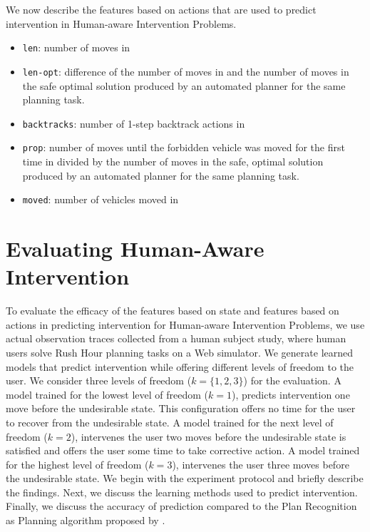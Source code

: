We now describe the features based on actions that are used to predict intervention in Human-aware Intervention Problems.
\begin{itemize}
\item \texttt{len}: number of moves in \historyDef
\item \texttt{len-opt}: difference of the number of moves in \historyDef and the number of moves in the safe optimal solution produced by an automated planner for the same planning task.
\item \texttt{backtracks}: number of 1-step backtrack actions in \historyDef
\item \texttt{prop}: number of moves until the forbidden vehicle was moved for the first time in \historyDef divided by the number of moves in the safe, optimal solution produced by an automated planner for the same planning task.
\item \texttt{moved}: number of vehicles moved in \historyDef
\end{itemize}

\section{Evaluating Human-Aware Intervention}
\label{sec:evaluating-hai}
To evaluate the efficacy of the features based on state and features based on actions in predicting intervention for Human-aware Intervention Problems, we use actual observation traces collected from a human subject study, where human users solve Rush Hour planning tasks on a Web simulator.
We generate learned models that predict intervention while offering different levels of freedom to the user. 
We consider three levels of freedom ($k=\lbrace 1,2,3 \rbrace$) for the evaluation. 
A model trained for the lowest level of freedom ($k=1$), predicts intervention one move before the undesirable state. 
This configuration offers no time for the user to recover from the undesirable state. 
A model trained for the next level of freedom ($k=2$), intervenes the user two moves before the undesirable state is satisfied and offers the user some time to take corrective action. 
A model trained for the highest level of freedom ($k=3$), intervenes the user three moves before the undesirable state.
We begin with the experiment protocol and briefly describe the findings. 
Next, we discuss the learning methods used to predict intervention. Finally, we discuss the accuracy of prediction compared to the Plan Recognition as Planning algorithm proposed by \cite{ramirez2010probabilistic}.


